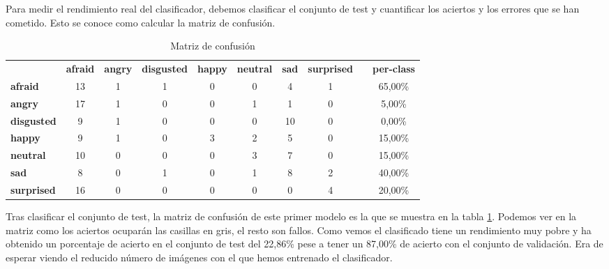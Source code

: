 \documentclass[a4paper,11pt]{book}
\begin{document}
Para medir el rendimiento real del clasificador, debemos clasificar el conjunto de test y cuantificar los aciertos y los errores que se han cometido. Esto se conoce como calcular la matriz de confusión.\\

\begin{table}[h]
	\centering
	\small
	\setlength\tabcolsep{3pt}
	\setlength\extrarowheight{2pt}
	\begin{tabular}{lccccccclc}
		& \multicolumn{1}{l}{\textbf{afraid}} & \multicolumn{1}{l}{\textbf{angry}} & \multicolumn{1}{l}{\textbf{disgusted}} & \multicolumn{1}{l}{\textbf{happy}} & \multicolumn{1}{l}{\textbf{neutral}} & \multicolumn{1}{l}{\textbf{sad}} & \multicolumn{1}{l}{\textbf{surprised}} &  & \multicolumn{1}{l}{\textbf{per-class}} \\
		\textbf{afraid}    & \cellcolor[HTML]{EFEFEF}13 & 1	& 1 & 0 & 0 & 4 & 1 &  & 65,00\% \\
		\textbf{angry}     & 17 & \cellcolor[HTML]{EFEFEF}1 & 0 & 0 & 1 & 1 & 0 &  & 5,00\% \\
		\textbf{disgusted} & 9 & 1 & \cellcolor[HTML]{EFEFEF}0 & 0 & 0 & 10 & 0 &  & 0,00\% \\
		\textbf{happy}     & 9 & 1 & 0 & \cellcolor[HTML]{EFEFEF}3 & 2 & 5 & 0 &  & 15,00\% \\
		\textbf{neutral}   & 10 & 0 & 0 & 0 & \cellcolor[HTML]{EFEFEF}3 & 7 & 0 &  & 15,00\% \\
		\textbf{sad}       & 8 & 0 & 1 & 0 & 1 & \cellcolor[HTML]{EFEFEF}8 & 2 &  & 40,00\% \\
		\textbf{surprised} & 16 & 0 & 0 & 0 & 0 & 0 & \cellcolor[HTML]{EFEFEF}4 &  & 20,00\%
	\end{tabular}
	\caption{Matriz de confusión}
	\label{tab:entrenamiento1MC}
\end{table}

Tras clasificar el conjunto de test, la matriz de confusión de este primer modelo es la que se muestra en la tabla \ref{tab:entrenamiento1MC}. Podemos ver en la matriz como los aciertos ocuparán las casillas en gris, el resto son fallos. Como vemos el clasificado tiene un rendimiento muy pobre y ha obtenido un porcentaje de acierto en el conjunto de test del 22,86\% pese a tener un 87,00\% de acierto con el conjunto de validación. Era de esperar viendo el reducido número de imágenes con el que hemos entrenado el clasificador.

\end{document}
